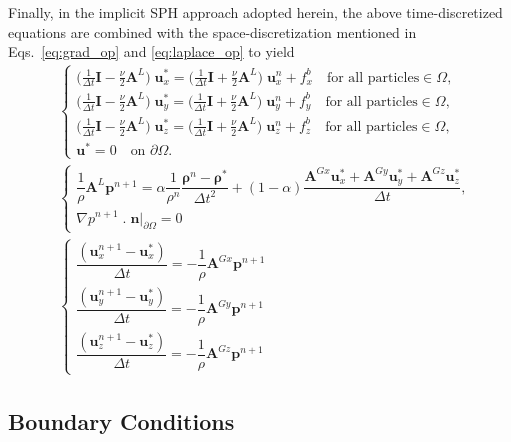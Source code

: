 \documentclass[final,3p,times]{elsarticle}
\begin{document}
Finally, in the implicit SPH approach adopted herein, the above time-discretized equations are combined with the space-discretization mentioned in Eqs.~\eqref{eq:grad_op} and \eqref{eq:laplace_op} to yield
\begin{align}
&\begin{cases}\label{eq:predict_disc} 
\Big(\frac{1}{\Delta t} \mathbf{I}-\frac{\nu}{2} \mathbf{A}^L\Big)\; \mathbf{u}^*_x=
\Big(\frac{1}{\Delta t} \mathbf{I}+\frac{\nu}{2} \mathbf{A}^L\Big) \; \mathbf{u}^n_x+ {f}^b_x \quad \text{for all particles}\in \Omega,\\
\Big(\frac{1}{\Delta t} \mathbf{I}-\frac{\nu}{2} \mathbf{A}^L\Big)\; \mathbf{u}^*_y=
\Big(\frac{1}{\Delta t} \mathbf{I}+\frac{\nu}{2} \mathbf{A}^L\Big) \; \mathbf{u}^n_y+ {f}^b_y \quad \text{for all particles}\in \Omega,\\
\Big(\frac{1}{\Delta t} \mathbf{I}-\frac{\nu}{2} \mathbf{A}^L\Big)\; \mathbf{u}^*_z=
\Big(\frac{1}{\Delta t} \mathbf{I}+\frac{\nu}{2} \mathbf{A}^L\Big) \; \mathbf{u}^n_z+ {f}^b_z \quad \text{for all particles} \in \Omega,\\
\mathbf{u}^*=0 \quad \text{on } \partial\Omega.
\end{cases}  \\
&\begin{cases}\label{eq:press_disc} 
\dfrac{1}{\rho} \mathbf{A}^L \mathbf{p}^{n+1}=\alpha\dfrac{1}{\rho^n}\dfrac{\mathbf{\rho}^n-\mathbf{\rho}^*}{\Delta t^2} + (1-\alpha) \dfrac{\mathbf{A}^{Gx} \mathbf{u}_x^*+\mathbf{A}^{Gy} \mathbf{u}_y^*+\mathbf{A}^{Gz}\mathbf{u}_z^*}{\Delta t},\\
\nabla p^{n+1}\;.\;\mathbf{n}|_{\partial \Omega}=0
\end{cases}\\
&\begin{cases}\label{eq:correct_disc} 
\dfrac{(\mathbf{u}_x^{n+1}-\mathbf{u}_x^*)}{\Delta t}=-\dfrac{1}{\rho} \mathbf{A}^{Gx} \mathbf{p}^{n+1} \\
\dfrac{(\mathbf{u}_y^{n+1}-\mathbf{u}_y^*)}{\Delta t}=-\dfrac{1}{\rho} \mathbf{A}^{Gy} \mathbf{p}^{n+1}\\
\dfrac{(\mathbf{u}_z^{n+1}-\mathbf{u}_z^*)}{\Delta t}=-\dfrac{1}{\rho} \mathbf{A}^{Gz} \mathbf{p}^{n+1}
\end{cases}
\end{align}


\subsection{Boundary Conditions}\label{sec:BC}
\end{document}
